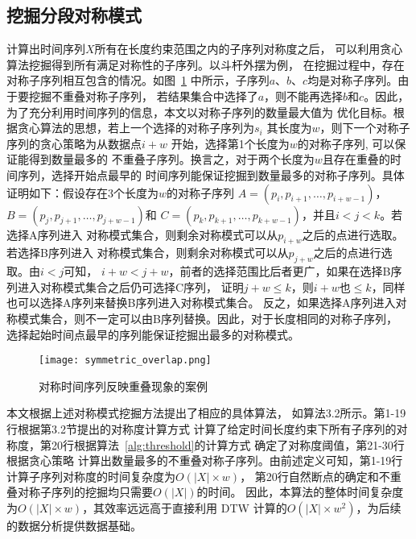 \subsection{挖掘分段对称模式}
计算出时间序列$X$所有在长度约束范围之内的子序列对称度之后，
可以利用贪心算法挖掘得到所有满足对称性的子序列。以斗杆外摆为例，
在挖掘过程中，存在对称子序列相互包含的情况。如图~\ref{fig:overlap}
中所示，子序列$a$、$b$、$c$均是对称子序列。由于要挖掘不重叠对称子序列，
若结果集合中选择了$a$，则不能再选择$b$和$c$。因此，
为了充分利用时间序列的信息，本文以对称子序列的数量最大值为
优化目标。根据贪心算法的思想，若上一个选择的对称子序列为$s_i$
其长度为$w$，则下一个对称子序列的贪心策略为从数据点$i+w$
开始，选择第1个长度为$w$的对称子序列, 可以保证能得到数量最多的
不重叠子序列。换言之，对于两个长度为$w$且存在重叠的时间序列，选择开始点最早的
时间序列能保证挖掘到数量最多的对称子序列。具体证明如下：假设存在3个长度为$w$的对称子序列
$A=\left(p_{i}, p_{i+1}, \dots, p_{i+w-1}\right)$，$B=\left(p_{j}, p_{j+1}, \dots, p_{j+w-1}\right)$和
$C=\left(p_{k}, p_{k+1}, \dots, p_{k+w-1}\right)$，并且$i<j<k$。若选择A序列进入
对称模式集合，则剩余对称模式可以从$p_{i+w}$之后的点进行选取。若选择B序列进入
对称模式集合，则剩余对称模式可以从$p_{j+w}$之后的点进行选取。由$i<j$可知，
$i+w<j+w$，前者的选择范围比后者更广，如果在选择B序列进入对称模式集合之后仍可选择C序列，
证明$j+w \leq k$，则$i+w$也$\leq k$，同样也可以选择A序列来替换B序列进入对称模式集合。
反之，如果选择A序列进入对称模式集合，则不一定可以由B序列替换。因此，对于长度相同的对称子序列，
选择起始时间点最早的序列能保证挖掘出最多的对称模式。

\begin{figure}
  \centering
  \texttt{[image: symmetric\_overlap.png]}
  \caption{对称时间序列反映重叠现象的案例}
  \label{fig:overlap}
\end{figure}

本文根据上述对称模式挖掘方法提出了相应的具体算法，
如算法3.2所示。第1-19行根据第3.2节提出的对称度计算方式
计算了给定时间长度约束下所有子序列的对称度，第20行根据算法~\ref{alg:threshold}的计算方式
确定了对称度阈值，第21-30行根据贪心策略
计算出数量最多的不重叠对称子序列。由前述定义可知，第1-19行计算子序列对称度的时间复杂度为$O(|X| \times w)$，
第20行自然断点的确定和不重叠对称子序列的挖掘均只需要$O(|X|)$的时间。
因此，本算法的整体时间复杂度为$O(|X| \times w)$，其效率远远高于直接利用
DTW 计算的$O\left(|X| \times w^{2}\right)$，为后续的数据分析提供数据基础。
\renewcommand{\algorithmicrequire}{\textbf{输入：}\unskip}
\renewcommand{\algorithmicensure}{\textbf{输出：}\unskip}


